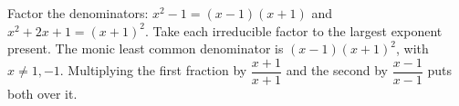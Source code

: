 Factor the denominators: $x^2-1=(x-1)(x+1)$ and $x^2+2x+1=(x+1)^2$. Take each irreducible factor to the largest exponent present. The monic least common denominator is $\boxed{(x-1)(x+1)^2}$, with $x\ne1,-1$. Multiplying the first fraction by $\dfrac{x+1}{x+1}$ and the second by $\dfrac{x-1}{x-1}$ puts both over it.
